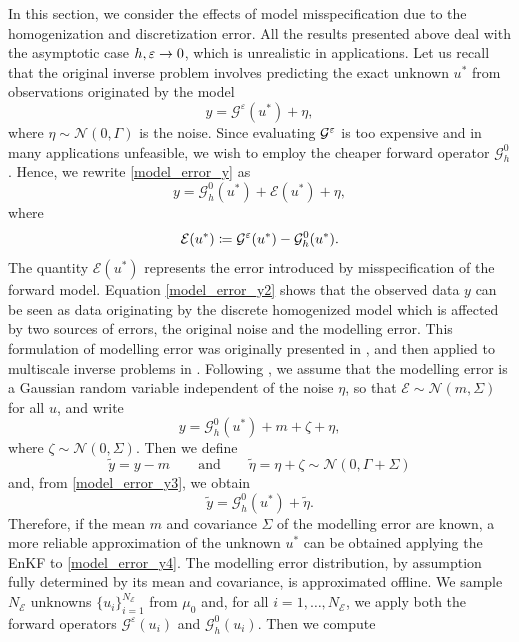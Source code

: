 \documentclass[10pt]{article}
\begin{document}
In this section, we consider the effects of model misspecification due to the homogenization and discretization error. All the results presented above deal with the asymptotic case $h, \varepsilon \to 0$, which is unrealistic in applications. Let us recall that the original inverse problem involves predicting the exact unknown $u^*$ from observations originated by the model
\begin{equation}
\label{model_error_y}
y = \mathcal{G}^{\varepsilon}(u^*) + \eta,
\end{equation}
where $\eta \sim \mathcal{N}(0,\Gamma)$ is the noise. Since evaluating $\mathcal G^\varepsilon$ is too expensive and in many applications unfeasible, we wish to employ the cheaper forward operator $\mathcal{G}^0_h$. Hence, we rewrite \eqref{model_error_y} as
\begin{equation}
\label{model_error_y2}
y = \mathcal{G}^0_h(u^*) + \mathcal{E}(u^*) + \eta,
\end{equation}
where
\[ \mathcal{E}(u^*) \coloneqq \mathcal{G}^{\varepsilon}(u^*) - \mathcal{G}^0_h(u^*). \]
The quantity $\mathcal{E}(u^*)$ represents the error introduced by misspecification of the forward model. Equation \eqref{model_error_y2} shows that the observed data $y$ can be seen as data originating by the discrete homogenized model which is affected by two sources of errors, the original noise and the modelling error. This formulation of modelling error was originally presented in \cite{CES14}, and then applied to multiscale inverse problems in \cite{AbD18}. Following \cite{CES14, AbD18}, we assume that the modelling error is a Gaussian random variable independent of the noise $\eta$, so that $\mathcal{E} \sim \mathcal{N}(m, \Sigma)$ for all $u$, and write
\begin{equation}
\label{model_error_y3}
y = \mathcal{G}^0_h(u^*) + m + \zeta + \eta,
\end{equation}
where $\zeta \sim \mathcal{N}(0, \Sigma)$. Then we define
\[ \tilde{y} = y - m \qquad \text{and} \qquad \tilde{\eta} = \eta + \zeta \sim \mathcal{N}(0, \Gamma + \Sigma) \]
and, from \eqref{model_error_y3}, we obtain
\begin{equation}
\label{model_error_y4}
\tilde{y} = \mathcal{G}^0_h(u^*) + \tilde{\eta}.
\end{equation}
Therefore, if the mean $m$ and covariance $\Sigma$ of the modelling error are known, a more reliable approximation of the unknown $u^*$ can be obtained applying the EnKF to \eqref{model_error_y4}. The modelling error distribution, by assumption fully determined by its mean and covariance, is approximated offline. We sample $N_{\mathcal{E}}$ unknowns $\{ u_i \}_{i=1}^{N_\mathcal{E}}$ from $\mu_0$ and, for all $i = 1, \dots, N_{\mathcal{E}}$, we apply both the forward operators $\mathcal{G}^{\varepsilon}(u_i)$ and $\mathcal{G}^0_h(u_i)$. Then we compute
\end{document}
